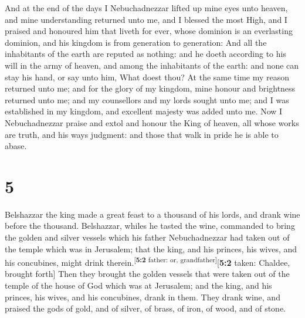  And at the end of the days I Nebuchadnezzar lifted up
mine eyes unto heaven, and mine understanding returned unto me, and I
blessed the most High, and I praised and honoured him that liveth for
ever, whose dominion is an everlasting dominion, and his kingdom is from
generation to generation:  And all the inhabitants of the
earth are reputed as nothing: and he doeth according to his will in the
army of heaven, and among the inhabitants of the earth: and none can
stay his hand, or say unto him, What doest thou?  At the
same time my reason returned unto me; and for the glory of my kingdom,
mine honour and brightness returned unto me; and my counsellors and my
lords sought unto me; and I was established in my kingdom, and excellent
majesty was added unto me.  Now I Nebuchadnezzar praise
and extol and honour the King of heaven, all whose works are truth, and
his ways judgment: and those that walk in pride he is able to abase.

\hypertarget{section-4}{%
\section{5}\label{section-4}}

 Belshazzar the king made a great feast to a thousand of
his lords, and drank wine before the thousand. 
Belshazzar, whiles he tasted the wine, commanded to bring the golden and
silver vessels which his father Nebuchadnezzar had taken out of the
temple which was in Jerusalem; that the king, and his princes, his
wives, and his concubines, might drink
therein.\textsuperscript{{[}\textbf{5:2} father: or,
grandfather{]}}{[}\textbf{5:2} taken: Chaldee, brought forth{]}
 Then they brought the golden vessels that were taken out
of the temple of the house of God which was at Jerusalem; and the king,
and his princes, his wives, and his concubines, drank in them.
 They drank wine, and praised the gods of gold, and of
silver, of brass, of iron, of wood, and of stone.

